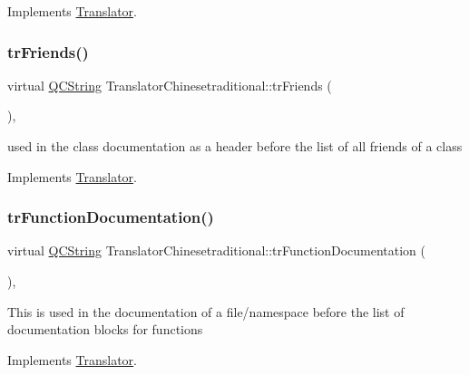 Implements \mbox{\hyperlink{class_translator}{Translator}}.

\mbox{\label{class_translator_chinesetraditional_a3b2466a051e3ce2d5a61c97fd219e6da}} 
\subsubsection{\texorpdfstring{trFriends()}{trFriends()}}
{\footnotesize\ttfamily virtual \mbox{\hyperlink{class_q_c_string}{Q\+C\+String}} Translator\+Chinesetraditional\+::tr\+Friends (\begin{DoxyParamCaption}{ }\end{DoxyParamCaption})\hspace{0.3cm}{\ttfamily [inline]}, {\ttfamily [virtual]}}

used in the class documentation as a header before the list of all friends of a class 

Implements \mbox{\hyperlink{class_translator}{Translator}}.

\mbox{\label{class_translator_chinesetraditional_aaf0f3a0b1de5254a585b8d52e23ac099}} 
\subsubsection{\texorpdfstring{trFunctionDocumentation()}{trFunctionDocumentation()}}
{\footnotesize\ttfamily virtual \mbox{\hyperlink{class_q_c_string}{Q\+C\+String}} Translator\+Chinesetraditional\+::tr\+Function\+Documentation (\begin{DoxyParamCaption}{ }\end{DoxyParamCaption})\hspace{0.3cm}{\ttfamily [inline]}, {\ttfamily [virtual]}}

This is used in the documentation of a file/namespace before the list of documentation blocks for functions 

Implements \mbox{\hyperlink{class_translator}{Translator}}.

